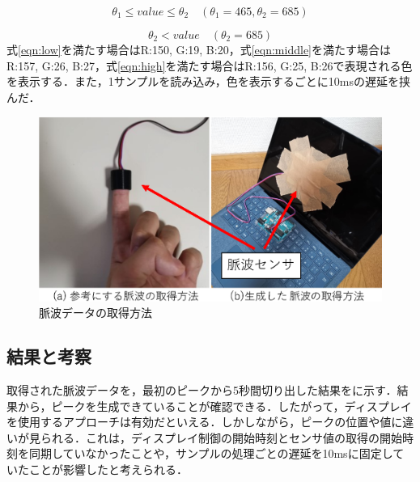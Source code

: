\documentclass[Japanese,noauthor]{dicomopapers}
\begin{document}
\begin{equation}
  \label{eqn:middle}
  \theta_{1} \leq value \leq \theta_{2} \quad (\theta_{1}=465, \theta_{2}=685)
\end{equation}

\begin{equation}
  \label{eqn:high}
  \theta_{2} < value \quad (\theta_{2}=685)
\end{equation}
式\ref{eqn:low}を満たす場合はR:150, G:19, B:20，式\ref{eqn:middle}を満たす場合はR:157, G:26, B:27，式\ref{eqn:high}を満たす場合はR:156, G:25, B:26で表現される色を表示する．また，1サンプルを読み込み，色を表示するごとに10msの遅延を挟んだ．

\begin{figure}[!t]
  \begin{center}
    \includegraphics[width=1\linewidth]{figures/sensors.eps}
  \end{center}
  \caption{脈波データの取得方法}
  \label{fig:sensors}
\end{figure}


\subsection{結果と考察}
取得された脈波データを，最初のピークから5秒間切り出した結果をに示す．結果から，ピークを生成できていることが確認できる．したがって，ディスプレイを使用するアプローチは有効だといえる．しかしながら，ピークの位置や値に違いが見られる．これは，ディスプレイ制御の開始時刻とセンサ値の取得の開始時刻を同期していなかったことや，サンプルの処理ごとの遅延を10msに固定していたことが影響したと考えられる．
\end{document}
